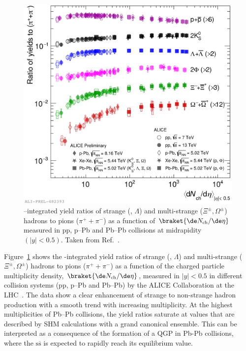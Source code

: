 \begin{figure}[htb]
  \centering
  \includegraphics[width=0.7\linewidth]{Figures/Chapter 1/img_ToPionRatios_1.pdf}
  \caption{\pt--integrated yield ratios of strange (\kzs, $\Lambda$) and multi-strange ($\Xi^\pm, \Omega^\pm$) hadrons to pions ($\pi^++\pi^-$) as a function of $\braket{\de N_\mathrm{ch}/\de\eta}$ measured in pp, p--Pb and Pb--Pb collisions at midrapidity$(\lvert y\rvert<0.5)$. Taken from Ref.~\cite{ALICE_figures}.}
  \label{fig:StrangenessEnhancement}
\end{figure}

Figure~\ref{fig:StrangenessEnhancement} shows the \pt-integrated yield ratios of strange (\kzs, $\Lambda$) and multi-strange ($\Xi^\pm, \Omega^\pm$) hadrons to pions ($\pi^++\pi^-$) as a function of the charged particle multiplicity density, $\braket{\de N_\mathrm{ch}/\de\eta}$, measured in $\lvert y\rvert<0.5$ in different collision systems (pp, p--Pb and Pb--Pb) by the ALICE Collaboration at the LHC~\cite{ALICE:2016fzo}. The data show a clear enhancement of strange to non-strange hadron production with a smooth trend with increasing multiplicity. At the highest multiplicities of Pb--Pb collisions, the yield ratios saturate at values that are described by SHM calculations with a grand canonical ensemble. This can be interpreted as a consequence of the formation of a QGP in Pb-Pb collisions, where the $\mathrm{s\overline{s}}$ is expected to rapidly reach its equilibrium value.


